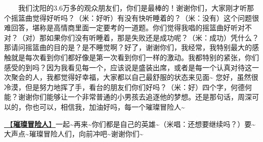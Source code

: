 \documentclass[]{ctexbook}
\begin{document}
  我们沈阳的3.6万多的观众朋友们，你们是最棒的！谢谢你们，大家刚才听那个摇篮曲觉得好听吗？（米：好听）有没有快听睡着的？（米：没有）这个问题很难回答，堪称是高情商里面一定要考的一道题。你们觉得我唱的摇篮曲好听对不对？（对）那如果你们没有听睡着，那是失败还是成功呢？（米：成功）凭什么？那请问摇篮曲的目的是？是不睡觉啊？好了，谢谢你们，我经常，我特别最大的感触就是每次看到你们都好像是第一次看到你们一样的激动。我都特别的紧张，你们感受的到吗？因为我看见每一个，应该说是盛装出席，或者是每一个认真对待这一次聚会的人，我都觉得好幸福，大家都以自己最舒服的状态来见面\textasciitilde{}
您好，虽然很冷漠，但是努力地挥了手，看台的朋友们你们好吗？（米：好）四个字，何德何能？谢谢你们能够让一个非常普通的小男孩去追逐他的梦想。还是那句话，周深可以的，你也可以，相信我，加油好吗，每一个璀璨冒险人\textasciitilde{}

\hyperref[adventurers]{🎵【\textbf{璀璨冒险人}】}一起\textasciitilde 再来\textasciitilde 你们都是自己的英雄\textasciitilde（米唱：还想要继续吗？）要\textasciitilde 大声点\textasciitilde 璀璨冒险人们，向前冲吧\textasciitilde 谢谢你们\textasciitilde{}
\end{document}
